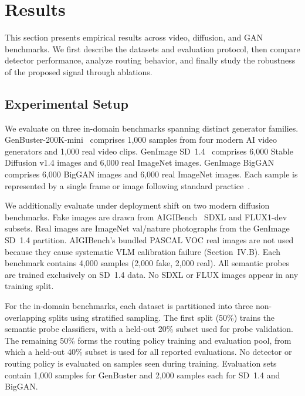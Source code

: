 \documentclass{ieeeaccess}
\begin{document}
\section{Results}

This section presents empirical results across video, diffusion, and GAN benchmarks. We first describe the datasets and evaluation protocol, then compare detector performance, analyze routing behavior, and finally study the robustness of the proposed signal through ablations.

\subsection{Experimental Setup}

We evaluate on three in-domain benchmarks spanning distinct generator families.
GenBuster-200K-mini~\cite{wen2025busterxmllmpoweredaigeneratedvideo} comprises 1{,}000
samples from four modern AI video generators and 1{,}000 real video clips.
GenImage SD~1.4~\cite{NEURIPS2023_f4d4a021} comprises 6{,}000 Stable Diffusion v1.4
images and 6{,}000 real ImageNet images. GenImage
BigGAN~\cite{NEURIPS2023_f4d4a021} comprises 6{,}000 BigGAN images and 6{,}000 real
ImageNet images. Each sample is represented by a single frame or image following standard
practice~\cite{wen2025busterxmllmpoweredaigeneratedvideo}.

We additionally evaluate under deployment shift on two modern diffusion benchmarks.
Fake images are drawn from AIGIBench~\cite{li2025artificial} SDXL and FLUX1-dev
subsets. Real images are ImageNet val/nature photographs from the GenImage SD~1.4
partition. AIGIBench's bundled PASCAL VOC real images are not used because they
cause systematic VLM calibration failure (Section~IV.B). Each benchmark contains
4{,}000 samples (2{,}000 fake, 2{,}000 real). All semantic probes are trained
exclusively on SD~1.4 data. No SDXL or FLUX images appear in any training split.


For the in-domain benchmarks, each dataset is partitioned into three non-overlapping splits
using stratified sampling. The first split (50\%) trains the semantic probe classifiers,
with a held-out 20\% subset used for probe validation. The remaining 50\% forms the routing
policy training and evaluation pool, from which a held-out 40\% subset is used for all
reported evaluations. No detector or routing policy is evaluated on samples seen during
training. Evaluation sets contain 1{,}000 samples for GenBuster and 2{,}000 samples each
for SD~1.4 and BigGAN.
\end{document}

